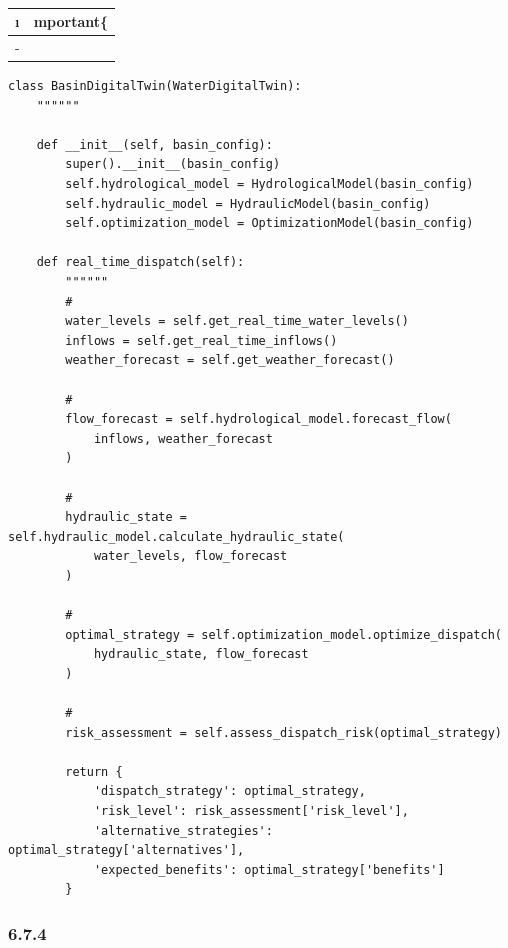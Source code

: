 \hypertarget{section-135}{%
\paragraph{}\label{section-135}}

\begin{longtable}[]{@{}ll@{}}
\toprule\noalign{}
\i & mportant\{} \\
\midrule\noalign{}
\endhead
\bottomrule\noalign{}
\endlastfoot
- & \important{} \\
\end{longtable}

\begin{lstlisting}[style=python]
class BasinDigitalTwin(WaterDigitalTwin):
    """"""
    
    def __init__(self, basin_config):
        super().__init__(basin_config)
        self.hydrological_model = HydrologicalModel(basin_config)
        self.hydraulic_model = HydraulicModel(basin_config)
        self.optimization_model = OptimizationModel(basin_config)
        
    def real_time_dispatch(self):
        """"""
        # 
        water_levels = self.get_real_time_water_levels()
        inflows = self.get_real_time_inflows()
        weather_forecast = self.get_weather_forecast()
        
        # 
        flow_forecast = self.hydrological_model.forecast_flow(
            inflows, weather_forecast
        )
        
        # 
        hydraulic_state = self.hydraulic_model.calculate_hydraulic_state(
            water_levels, flow_forecast
        )
        
        # 
        optimal_strategy = self.optimization_model.optimize_dispatch(
            hydraulic_state, flow_forecast
        )
        
        # 
        risk_assessment = self.assess_dispatch_risk(optimal_strategy)
        
        return {
            'dispatch_strategy': optimal_strategy,
            'risk_level': risk_assessment['risk_level'],
            'alternative_strategies': optimal_strategy['alternatives'],
            'expected_benefits': optimal_strategy['benefits']
        }
\end{lstlisting}

\hypertarget{section-136}{%
\subsubsection{6.7.4}\label{section-136}}

